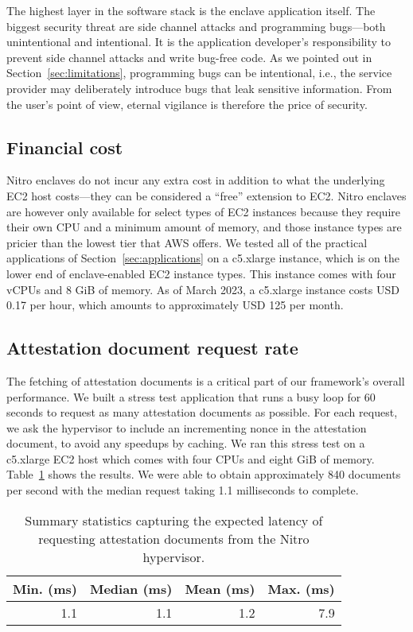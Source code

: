 The highest layer in the software stack is the enclave application itself.  The
biggest security threat are side channel attacks and programming bugs---both
unintentional and intentional.  It is the application developer's
responsibility to prevent side channel attacks and write bug-free code.  As we
pointed out in Section~\ref{sec:limitations}, programming bugs can be
intentional, i.e., the service provider may deliberately introduce bugs that
leak sensitive information.  From the user's point of view, eternal vigilance
is therefore the price of security.

\subsection{Financial cost}%
\label{sec:cost}

Nitro enclaves do not incur any extra cost in addition to what the underlying
EC2 host costs---they can be considered a ``free'' extension to EC2.  Nitro
enclaves are however only available for select types of EC2 instances because
they require their own CPU and a minimum amount of memory, and those instance
types are pricier than the lowest tier that AWS offers.  We tested all of the
practical applications of Section~\ref{sec:applications} on a c5.xlarge
instance, which is on the lower end of enclave-enabled EC2 instance types.
This instance comes with four vCPUs and 8 GiB of memory.  As of March 2023, a
c5.xlarge instance costs USD 0.17 per hour, which amounts to approximately USD
125 per month.

\subsection{Attestation document request rate}%
\label{sec:attestation-performance}

The fetching of attestation documents is a critical part of our framework's
overall performance.  We built a stress test application that runs a busy loop
for 60 seconds to request as many attestation documents as possible.  For each
request, we ask the hypervisor to include an incrementing nonce in the
attestation document, to avoid any speedups by caching.  We ran this stress test
on a c5.xlarge EC2 host which comes with four CPUs and eight GiB of memory.
Table~\ref{tab:att-perf} shows the results.  We were able to obtain
approximately 840 documents per second with the median request taking 1.1
milliseconds to complete.

\begin{table}[t]
    \centering
    \begin{tabular}{r r r r}
    \toprule
      Min. (ms) & Median (ms) & Mean (ms) & Max. (ms) \\
    \midrule
      1.1 & 1.1 & 1.2 & 7.9 \\
    \bottomrule
    \end{tabular}
    \caption{Summary statistics capturing the expected latency of requesting
    attestation documents from the Nitro hypervisor.}%
    \label{tab:att-perf}
\end{table}

